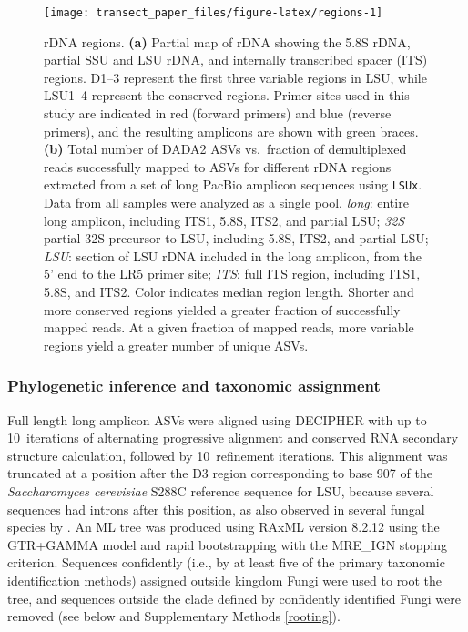\documentclass[
  12pt,
]{article}
\begin{document}
\begin{figure}

{\centering \texttt{[image: transect\_paper\_files/figure-latex/regions-1]} 

}

\caption[rDNA regions]{rDNA regions. \textbf{(a)} Partial map of rDNA showing the 5.8S rDNA, partial SSU and LSU rDNA, and internally transcribed spacer (ITS) regions. D1--3 represent the first three variable regions in LSU, while LSU1--4 represent the conserved regions. Primer sites used in this study are indicated in red (forward primers) and blue (reverse primers), and the resulting amplicons are shown with green braces. \textbf{(b)} Total number of DADA2 ASVs vs.~fraction of demultiplexed reads successfully mapped to ASVs for different rDNA regions extracted from a set of long PacBio amplicon sequences using \texttt{LSUx}. Data from all samples were analyzed as a single pool. \emph{long}: entire long amplicon, including ITS1, 5.8S, ITS2, and partial LSU; \emph{32S} partial 32S precursor to LSU, including 5.8S, ITS2, and partial LSU; \emph{LSU}: section of LSU rDNA included in the long amplicon, from the 5' end to the LR5 primer site; \emph{ITS}: full ITS region, including ITS1, 5.8S, and ITS2. Color indicates median region length. Shorter and more conserved regions yielded a greater fraction of successfully mapped reads. At a given fraction of mapped reads, more variable regions yield a greater number of unique ASVs.}\label{fig:regions}
\end{figure}

\hypertarget{phylogenetic-inference-and-taxonomic-assignment}{%
\subsubsection{Phylogenetic inference and taxonomic assignment}\label{phylogenetic-inference-and-taxonomic-assignment}}

Full length long amplicon ASVs were aligned using DECIPHER \autocite{wright2015} with up to 10~iterations of alternating progressive alignment and conserved RNA secondary structure calculation, followed by 10~refinement iterations.
This alignment was truncated at a position after the D3 region corresponding to base 907 of the \emph{Saccharomyces cerevisiae} S288C reference sequence for LSU, because several sequences had introns after this position, as also observed in several fungal species by \textcite{holst-jensen1999}.
An ML tree was produced using RAxML version 8.2.12 \autocite{stamatakis2014} using the GTR+GAMMA model and rapid bootstrapping with the MRE\_IGN stopping criterion.
Sequences confidently (i.e., by at least five of the primary taxonomic identification methods) assigned outside kingdom Fungi were used to root the tree, and sequences outside the clade defined by confidently identified Fungi were removed (see below and Supplementary Methods \ref{rooting}).
\end{document}
